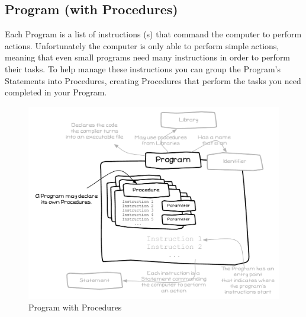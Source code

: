\clearpage
\subsection{Program (with Procedures)} %
\label{sub:program_with_procedures_}

Each Program is a list of instructions (s) that command the computer to perform actions. Unfortunately the computer is only able to perform simple actions, meaning that even small programs need many instructions in order to perform their tasks. To help manage these instructions you can group the Program's Statements into Procedures, creating Procedures that perform the tasks you need completed in your Program.

\begin{figure}[h]
   \centering
   \includegraphics[width=\textwidth]{./topics/procedure-decl/diagrams/ProgramWithProc} 
   \caption{Program with Procedures}
   \label{fig:procedure-decl-program}
\end{figure}


